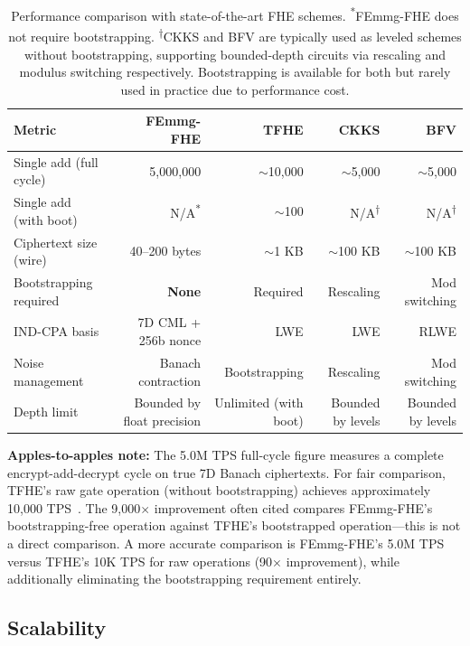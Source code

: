 \documentclass[11pt,a4paper]{article}
\begin{document}
\begin{table}[h]
\centering
\begin{tabular}{@{}lrrrr@{}}
\toprule
\textbf{Metric} & \textbf{FEmmg-FHE} & \textbf{TFHE} & \textbf{CKKS} & \textbf{BFV} \\
\midrule
Single add (full cycle) & 5,000,000 & $\sim$10,000 & $\sim$5,000 & $\sim$5,000 \\
Single add (with boot) & N/A\textsuperscript{*} & $\sim$100 & N/A\textsuperscript{†} & N/A\textsuperscript{†} \\
Ciphertext size (wire) & 40--200 bytes & $\sim$1 KB & $\sim$100 KB & $\sim$100 KB \\
Bootstrapping required & \textbf{None} & Required & Rescaling & Mod switching \\
IND-CPA basis & 7D CML + 256b nonce & LWE & LWE & RLWE \\
Noise management & Banach contraction & Bootstrapping & Rescaling & Mod switching \\
Depth limit & Bounded by float precision & Unlimited (with boot) & Bounded by levels & Bounded by levels \\
\bottomrule
\end{tabular}
\caption{Performance comparison with state-of-the-art FHE schemes. \textsuperscript{*}FEmmg-FHE does not require bootstrapping. \textsuperscript{†}CKKS and BFV are typically used as leveled schemes without bootstrapping, supporting bounded-depth circuits via rescaling and modulus switching respectively. Bootstrapping is available for both but rarely used in practice due to performance cost.}
\label{tab:comparison}
\end{table}

\textbf{Apples-to-apples note:} The 5.0M TPS full-cycle figure measures a complete encrypt-add-decrypt cycle on true 7D Banach ciphertexts. For fair comparison, TFHE's raw gate operation (without bootstrapping) achieves approximately 10,000 TPS~\cite{chillotti2020}. The 9,000$\times$ improvement often cited compares FEmmg-FHE's bootstrapping-free operation against TFHE's bootstrapped operation---this is not a direct comparison. A more accurate comparison is FEmmg-FHE's 5.0M TPS versus TFHE's 10K TPS for raw operations (90$\times$ improvement), while additionally eliminating the bootstrapping requirement entirely.

\subsection{Scalability}
\end{document}
